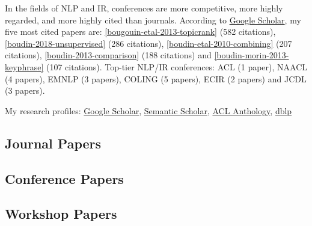 In the fields of NLP and IR, conferences are more competitive, more highly regarded, and more highly cited than journals.
%
According to \href{https://scholar.google.com/citations?user=Vk68rbkAAAAJ}{Google Scholar}, my five most cited papers are: 
\ref{bougouin-etal-2013-topicrank} {\small (582 citations)}, 
\ref{boudin-2018-unsupervised} {\small (286 citations)}, 
\ref{boudin-etal-2010-combining} {\small (207 citations)}, 
\ref{boudin-2013-comparison} {\small (188 citations)} and 
\ref{boudin-morin-2013-keyphrase} {\small (107 citations)}.
%
Top-tier NLP/IR conferences: 
ACL {\small (1 paper)}, 
NAACL {\small (4 papers)}, 
EMNLP {\small (3 papers)}, 
COLING {\small (5 papers)}, 
ECIR {\small (2 papers)} and 
JCDL {\small (3 papers)}.

\vspace{1em}

My research profiles: 
\href{https://scholar.google.com/citations?user=Vk68rbkAAAAJ}{Google Scholar}, 
\href{https://www.semanticscholar.org/author/Florian-Boudin/2346578}{Semantic Scholar},
\href{https://aclanthology.org/people/f/florian-boudin/}{ACL Anthology},
\href{https://dblp.org/pid/54/2762.html}{dblp}


\subsection{Journal Papers}

\begin{enumerate}[label=(J{\scriptsize\arabic*}),font=\small\bfseries\color{VioletRed},itemsep=0cm]
    
\end{enumerate}

\subsection{Conference Papers}

\begin{enumerate}[label=(C{\scriptsize\arabic*}),font=\small\bfseries\color{VioletRed},itemsep=0cm]
    
\end{enumerate}

\subsection{Workshop Papers}

\begin{enumerate}[label=(W{\scriptsize\arabic*}),font=\small\bfseries\color{VioletRed},itemsep=0cm]
    
\end{enumerate}


